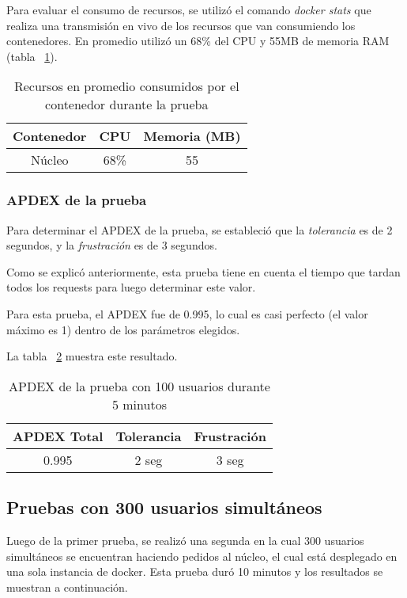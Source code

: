 Para evaluar el consumo de recursos, se utilizó el comando \textit{docker stats} que realiza una transmisión en vivo de los recursos que van consumiendo los contenedores.
En promedio utilizó un 68\% del CPU y 55MB de memoria RAM (tabla ~\ref{tab:100u_5m_rec}).


\begin{table}[!htbp]
    \centering
    \makegapedcells
    \begin{tabular}{|c|c|c|}
    \hline
    Contenedor & CPU & Memoria (MB)\\ \hline
    Núcleo & 68\% & 55 \\ \hline
    \end{tabular}
    \caption{Recursos en promedio consumidos por el contenedor durante la prueba}
    \label{tab:100u_5m_rec}
\end{table}


\subsubsection{APDEX de la prueba}

Para determinar el APDEX de la prueba, se estableció que la \textit{tolerancia} es de 2 segundos, y la \textit{frustración} es de 3 segundos. 

Como se explicó anteriormente, esta prueba tiene en cuenta el tiempo que tardan todos los requests para luego determinar este valor.

Para esta prueba, el APDEX fue de 0.995, lo cual es casi perfecto (el valor máximo es 1) dentro de los parámetros elegidos.

La tabla ~\ref{tab:100u_5m_apdex} muestra este resultado.

\begin{table}[!htbp]
    \centering
    \makegapedcells
    \begin{tabular}{|c|c|c|}
    \hline
    APDEX Total & Tolerancia & Frustración\\ \hline
    0.995 & 2 seg & 3 seg \\ \hline
    \end{tabular}
    \caption{APDEX de la prueba con 100 usuarios durante 5 minutos}
    \label{tab:100u_5m_apdex}
\end{table}

\break

\subsection{Pruebas con 300 usuarios simultáneos}
Luego de la primer prueba, se realizó una segunda en la cual 300 usuarios simultáneos se encuentran haciendo pedidos al núcleo, el cual está desplegado en una sola instancia de docker.
Esta prueba duró 10 minutos y los resultados se muestran a continuación.

